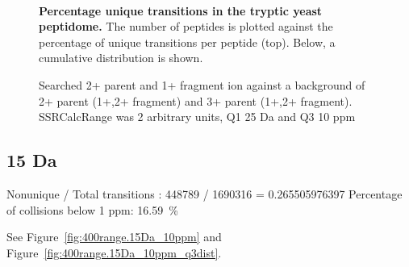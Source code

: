 \begin{figure}

\center
{} \\

\caption{ \textbf{Percentage unique transitions in the tryptic yeast peptidome.}
The number of peptides is plotted against the percentage of unique transitions
per peptide (top). Below, a cumulative distribution is shown.
}
\label{fig:400range.25Da_10ppm}
\end{figure}
\begin{figure}

\center
{}

\caption{
Searched 2+ parent and 1+ fragment ion against a background of 2+ parent (1+,2+ fragment) and 3+ parent (1+,2+ fragment).
SSRCalcRange was 2 arbitrary units, Q1 25 Da and Q3 10 ppm
}
\label{fig:400range.25Da_10ppm_q3dist}
\end{figure}


\subsection{15 Da}

Nonunique / Total transitions : 448789 / 1690316 = 0.265505976397
Percentage of collisions below 1 ppm: 16.59~\%


See Figure~\ref{fig:400range.15Da_10ppm} and Figure~\ref{fig:400range.15Da_10ppm_q3dist}.

